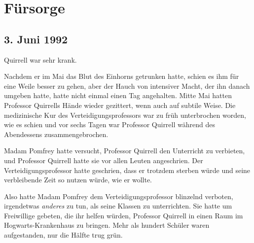 \chapter{Fürsorge}

\section{3. Juni 1992}

 Quirrell war sehr krank.

\hplettrineextrapara
Nachdem er im Mai das Blut des Einhorns getrunken hatte, schien es ihm für eine Weile besser zu gehen, aber der Hauch von intensiver Macht, der ihn danach umgeben hatte, hatte nicht einmal einen Tag angehalten. Mitte Mai hatten Professor Quirrells Hände wieder gezittert, wenn auch auf subtile Weise. Die medizinische Kur des Verteidigungsprofessors war zu früh unterbrochen worden, wie es schien und vor sechs Tagen war Professor Quirrell während des Abendessens zusammengebrochen.

Madam Pomfrey hatte versucht, Professor Quirrell den Unterricht zu verbieten, und Professor Quirrell hatte sie vor allen Leuten angeschrien. Der Verteidigungsprofessor hatte geschrien, dass er trotzdem sterben würde und seine verbleibende Zeit so nutzen würde, wie er wollte.

Also hatte Madam Pomfrey dem Verteidigungsprofessor blinzelnd verboten, irgendetwas \emph{anderes} zu tun, als seine Klassen zu unterrichten.
Sie hatte um Freiwillige gebeten, die ihr helfen würden, Professor Quirrell in einen Raum im Hogwarts-Krankenhaus zu bringen. Mehr als hundert Schüler waren aufgestanden, nur die Hälfte trug grün.

